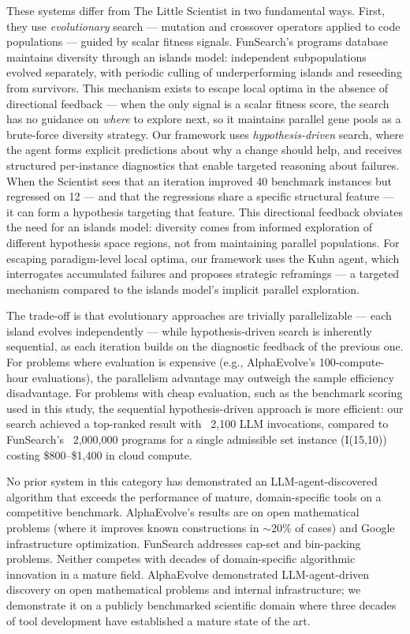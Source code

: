 \documentclass[11pt,a4paper]{article}
\begin{document}
These systems differ from The Little Scientist in two fundamental ways. First, they use \emph{evolutionary} search --- mutation and crossover operators applied to code populations --- guided by scalar fitness signals. FunSearch's programs database maintains diversity through an islands model: independent subpopulations evolved separately, with periodic culling of underperforming islands and reseeding from survivors. This mechanism exists to escape local optima in the absence of directional feedback --- when the only signal is a scalar fitness score, the search has no guidance on \emph{where} to explore next, so it maintains parallel gene pools as a brute-force diversity strategy. Our framework uses \emph{hypothesis-driven} search, where the agent forms explicit predictions about why a change should help, and receives structured per-instance diagnostics that enable targeted reasoning about failures. When the Scientist sees that an iteration improved 40 benchmark instances but regressed on 12 --- and that the regressions share a specific structural feature --- it can form a hypothesis targeting that feature. This directional feedback obviates the need for an islands model: diversity comes from informed exploration of different hypothesis space regions, not from maintaining parallel populations. For escaping paradigm-level local optima, our framework uses the Kuhn agent, which interrogates accumulated failures and proposes strategic reframings --- a targeted mechanism compared to the islands model's implicit parallel exploration.

The trade-off is that evolutionary approaches are trivially parallelizable --- each island evolves independently --- while hypothesis-driven search is inherently sequential, as each iteration builds on the diagnostic feedback of the previous one. For problems where evaluation is expensive (e.g., AlphaEvolve's 100-compute-hour evaluations), the parallelism advantage may outweigh the sample efficiency disadvantage. For problems with cheap evaluation, such as the benchmark scoring used in this study, the sequential hypothesis-driven approach is more efficient: our search achieved a top-ranked result with ~2,100 LLM invocations, compared to FunSearch's ~2,000,000 programs for a single admissible set instance (I(15,10)) costing \$800--\$1,400 in cloud compute.

No prior system in this category has demonstrated an LLM-agent-discovered algorithm that exceeds the performance of mature, domain-specific tools on a competitive benchmark. AlphaEvolve's results are on open mathematical problems (where it improves known constructions in $\sim$20\% of cases) and Google infrastructure optimization. FunSearch addresses cap-set and bin-packing problems. Neither competes with decades of domain-specific algorithmic innovation in a mature field. AlphaEvolve demonstrated LLM-agent-driven discovery on open mathematical problems and internal infrastructure; we demonstrate it on a publicly benchmarked scientific domain where three decades of tool development have established a mature state of the art.
\end{document}
